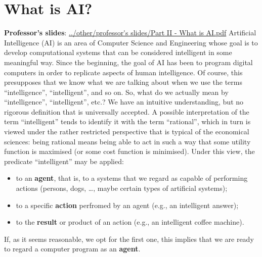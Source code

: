 \section{What is AI?}
\textbf{Professor's slides}:\newline
\url{../other/professor's slides/Part II - What is AI.pdf}\newline
\newline
Artificial Intelligence (AI) is an area of Computer Science and Engineering whose goal is to
develop computational systems that can be considered intelligent in some meaningful way.\newline
\newline
Since the beginning, the goal of AI has been to program digital computers in order to
replicate aspects of human intelligence.\newline
Of course, this presupposes that we know what we are talking about when we use the
terms “intelligence”, “intelligent”, and so on.\newline
\newline
So, what do we actually mean by “intelligence”, “intelligent”, etc.?\newline
We have an intuitive understanding, but no rigorous definition that is universally accepted.\newline
\newline
A possible interpretation of the term “intelligent” tends to identify it with the term
“rational”, which in turn is viewed under the rather restricted perspective that is typical of
the economical sciences: being rational means being able to act in such a way that some
utility function is maximised (or some cost function is minimised).\newline
\newline
Under this view, the predicate “intelligent” may be applied:
\begin{itemize}
    \item to an \textbf{agent}, that is, to a systems that we regard as capable of performing actions
    (persons, dogs, …, maybe certain types of artificial systems);
    \item to a specific \textbf{action} perfromed by an agent (e.g., an intelligent answer);
    \item to the \textbf{result} or product of an action (e.g., an intelligent coffee machine).
\end{itemize}
If, as it seems reasonable, we opt for the first one, this implies that we are ready to regard a computer
program as an \textbf{agent}.